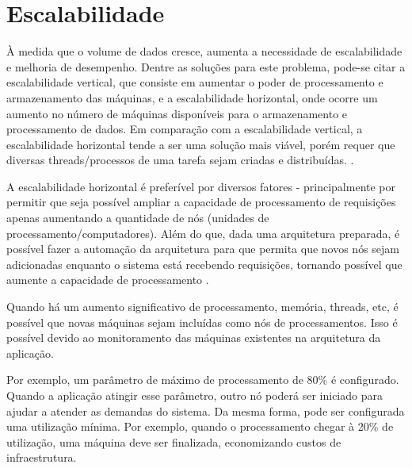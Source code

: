 \chapter{Escalabilidade}\label{escalabilidade}

\begin{citacao}

À medida que o volume de dados cresce, aumenta a
necessidade de escalabilidade e melhoria de desempenho. Dentre as soluções para este
problema, pode-se citar a escalabilidade vertical, que consiste em aumentar o poder de
processamento e armazenamento das máquinas, e a escalabilidade horizontal, onde ocorre um
aumento no número de máquinas disponíveis para o armazenamento e processamento de
dados. Em comparação com a escalabilidade vertical, a escalabilidade horizontal tende a ser
uma solução mais viável, porém requer que diversas threads/processos de uma tarefa sejam
criadas e distribuídas. \cite[3]{alexandre-morais-souza-2013}.

\end{citacao}

A escalabilidade horizontal é preferível por diversos fatores - principalmente por
permitir que seja possível ampliar a capacidade de processamento de requisições
apenas aumentando a quantidade de nós (unidades de processamento/computadores).
Além do que, dada uma arquitetura preparada, é possível fazer a automação da
arquitetura para que permita que novos nós sejam adicionadas enquanto o
sistema está recebendo requisições, tornando possível que aumente a capacidade
de processamento \cite{ivens-oliveira-porto-2009}.

Quando há um aumento significativo de processamento, memória, threads, etc,
é possível que novas máquinas sejam incluídas como nós de processamentos.
Isso é possível devido ao monitoramento das máquinas existentes na arquitetura
da aplicação.

Por exemplo, um parâmetro de máximo de processamento de 80\% é configurado.
Quando a aplicação atingir esse parâmetro, outro nó poderá ser iniciado para ajudar
a atender as demandas do sistema. Da mesma forma, pode ser configurada uma utilização
mínima. Por exemplo, quando o processamento chegar à 20\% de utilização, uma máquina
deve ser finalizada, economizando custos de infraestrutura.






